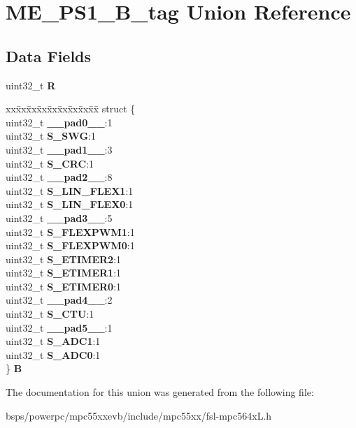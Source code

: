 \hypertarget{unionME__PS1__32B__tag}{}\section{M\+E\+\_\+\+P\+S1\+\_\+B\+\_\+tag Union Reference}
\label{unionME__PS1__32B__tag}
\subsection*{Data Fields}
\begin{DoxyCompactItemize}
\item 
\mbox{\label{unionME__PS1__32B__tag_ac141704bc91038542ce22a4ff8df137b}} 
uint32\+\_\+t {\bfseries R}
\item 
\mbox{\label{unionME__PS1__32B__tag_ad0d5cd4aba46c61b6b522515df8ed7cd}} 
\begin{tabbing}
xx\=xx\=xx\=xx\=xx\=xx\=xx\=xx\=xx\=\kill
struct \{\\
\>uint32\_t {\bfseries \_\_pad0\_\_}:1\\
\>uint32\_t {\bfseries S\_SWG}:1\\
\>uint32\_t {\bfseries \_\_pad1\_\_}:3\\
\>uint32\_t {\bfseries S\_CRC}:1\\
\>uint32\_t {\bfseries \_\_pad2\_\_}:8\\
\>uint32\_t {\bfseries S\_LIN\_FLEX1}:1\\
\>uint32\_t {\bfseries S\_LIN\_FLEX0}:1\\
\>uint32\_t {\bfseries \_\_pad3\_\_}:5\\
\>uint32\_t {\bfseries S\_FLEXPWM1}:1\\
\>uint32\_t {\bfseries S\_FLEXPWM0}:1\\
\>uint32\_t {\bfseries S\_ETIMER2}:1\\
\>uint32\_t {\bfseries S\_ETIMER1}:1\\
\>uint32\_t {\bfseries S\_ETIMER0}:1\\
\>uint32\_t {\bfseries \_\_pad4\_\_}:2\\
\>uint32\_t {\bfseries S\_CTU}:1\\
\>uint32\_t {\bfseries \_\_pad5\_\_}:1\\
\>uint32\_t {\bfseries S\_ADC1}:1\\
\>uint32\_t {\bfseries S\_ADC0}:1\\
\} {\bfseries B}\\

\end{tabbing}\end{DoxyCompactItemize}


The documentation for this union was generated from the following file\+:\begin{DoxyCompactItemize}
\item 
bsps/powerpc/mpc55xxevb/include/mpc55xx/fsl-\/mpc564x\+L.\+h\end{DoxyCompactItemize}
